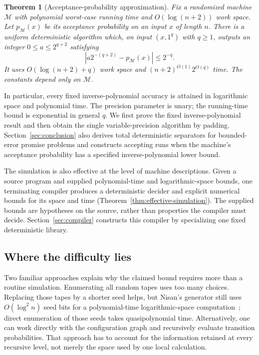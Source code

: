 \documentclass[11pt]{article}
\numberwithin{equation}{section}
\newtheorem{theorem}{Theorem}[section]
\theoremstyle{definition}
\theoremstyle{remark}
\begin{document}
\begin{theorem}[Acceptance-probability approximation]\label{thm:probability}
Fix a randomized machine $\mathcal M$ with polynomial worst-case
running time and $O(\log(n+2))$ work space. Let $p_{\mathcal M}(x)$ be
its acceptance probability on an input $x$ of length $n$. There is a
uniform deterministic algorithm which, on input $(x,1^q)$ with $q\ge1$,
outputs an integer $0\le a\le2^{q+2}$ satisfying
\[
       \left|a2^{-(q+2)}-p_{\mathcal M}(x)\right|\le2^{-q}.
\]
It uses $O(\log(n+2)+q)$ work space and
$(n+2)^{O(1)}2^{O(q)}$ time. The constants depend only on $\mathcal M$.
\end{theorem}

In particular, every fixed inverse-polynomial accuracy is attained in
logarithmic space and polynomial time. The precision parameter is unary;
the running-time bound is exponential in general $q$. We first prove
the fixed inverse-polynomial result and then obtain the single
variable-precision algorithm by padding. Section~\ref{sec:conclusion}
also derives total deterministic separators for bounded-error promise
problems and constructs accepting runs when the machine's acceptance
probability has a specified inverse-polynomial lower bound.

The simulation is also effective at the level of machine descriptions.
Given a source program and supplied polynomial-time and logarithmic-space
bounds, one terminating compiler produces a deterministic decider and
explicit numerical bounds for its space and time
(Theorem~\ref{thm:effective-simulation}). The supplied bounds are
hypotheses on the source, rather than properties the compiler must decide.
Section~\ref{sec:compiler} constructs this compiler by specializing one
fixed deterministic library.


\subsection{Where the difficulty lies}

Two familiar approaches explain why the claimed bound requires more than a routine simulation. Enumerating all random tapes uses too many choices. Replacing those tapes by a shorter seed helps, but Nisan's generator still uses $O(\log^2 n)$ seed bits for a polynomial-time logarithmic-space computation~\cite{Nisan1992}; direct enumeration of those seeds takes quasipolynomial time. Alternatively, one can work directly with the configuration graph and recursively evaluate transition probabilities. That approach has to account for the information retained at every recursive level, not merely the space used by one local calculation.
\end{document}
